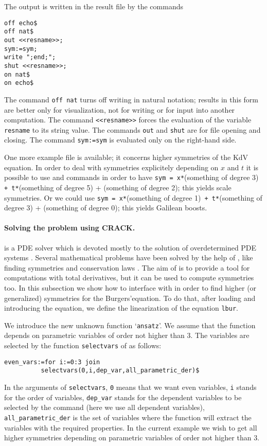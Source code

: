 The output is written in the result file by the commands
\begin{verbatim}
off echo$
off nat$
out <<resname>>;
sym:=sym;
write ";end;";
shut <<resname>>;
on nat$
on echo$
\end{verbatim}
The command \texttt{off nat} turns off writing in natural notation; results in
this form are better only for visualization, not for writing or for input into
another computation. The command \texttt{<<resname>>} forces the evaluation of
the variable \texttt{resname} to its string value. The commands \texttt{out}
and \texttt{shut} are for file opening and closing. The command
\texttt{sym:=sym} is evaluated only on the right-hand side.

One more example file is available; it concerns higher symmetries of the KdV
equation. In order to deal with symmetries explicitely depending on $x$ and
$t$ it is possible to use \REDUCE and \cde commands in order to have
\texttt{sym = x*}(something of degree 3)\texttt{ + t*}(something of degree  5)
+ (something of degree 2); this yields scale symmetries.
Or we could use \texttt{sym = x*}(something of degree 1)\texttt{ +
  t*}(something of degree 3) + (something of degree 0);
this yields Galilean boosts.

\paragraph*{Solving the problem using CRACK.}
\crack is a PDE solver which is devoted mostly to the solution of
overdetermined PDE systems \cite{Brand:95,WolfBrand:CRACK}. Several mathematical problems
have been solved by the help of \crack, like finding symmetries
\cite{Wolf:APPLYSYM,Brand:92} and conservation laws \cite{Wolf:99d}. The aim of \cde is
to provide a tool for computations with total derivatives, but it can be used
to compute symmetries too. In this subsection we show how to interface \cde
with \crack in order to find higher (or generalized) symmetries for the
Burgers'equation. To do that, after loading \cde and introducing the equation,
we define the linearization of the equation \texttt{lbur}.

We introduce the new unknown function `\texttt{ansatz}'. We assume that the
function depends on parametric variables of order not higher than $3$.  The
variables are selected by the function \texttt{selectvars} of \cde as follows:
\begin{verbatim}
even_vars:=for i:=0:3 join
          selectvars(0,i,dep_var,all_parametric_der)$
\end{verbatim}
In the arguments of \texttt{selectvars}, \texttt{0} means that we want even
variables, \texttt{i} stands for the order of variables, \texttt{dep\_var}
stands for the dependent variables to be selected by the command (here we use
all dependent variables), \texttt{all\_parametric\_der} is the set of variables
where the function will extract the variables with the required properties.
In the current example we wish to get all higher symmetries depending on
parametric variables of order not higher than $3$.

